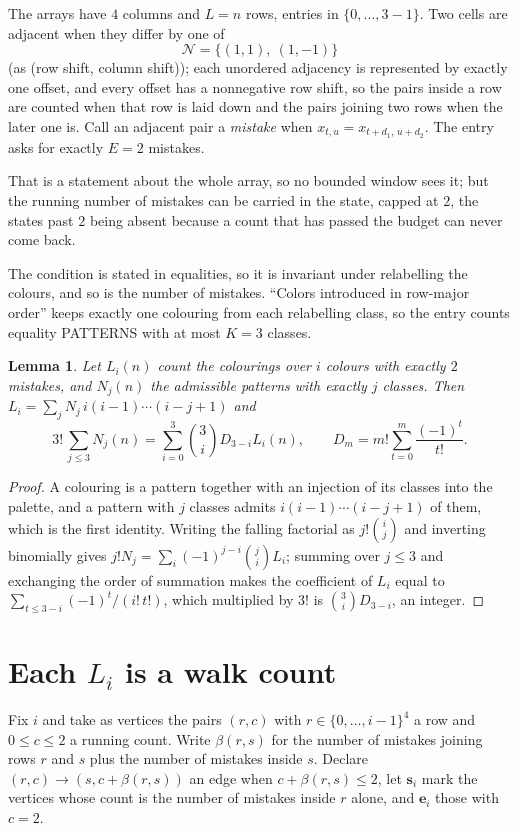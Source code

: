 \documentclass[11pt,a4paper]{article}
\theoremstyle{plain}
\newtheorem{lemma}[theorem]{Lemma}
\theoremstyle{definition}
\begin{document}
The arrays have $4$ columns and $L=n$ rows, entries in $\{0,\dots,3-1\}$.
Two cells are adjacent when they differ by one of
\[
\mathcal N=\{(1,1),\ (1,-1)\}
\]
(as (row shift, column shift)); each unordered adjacency is represented by exactly one
offset, and every offset has a nonnegative row shift, so the pairs inside a row are
counted when that row is laid down and the pairs joining two rows when the later one
is. Call an adjacent pair a \emph{mistake} when $x_{t,u}=x_{t+d_1,\,u+d_2}$. The entry asks for exactly
$E=2$ mistakes.

That is a statement about the whole array, so no bounded window sees it; but the running
number of mistakes can be carried in the state, capped at $2$, the states past $2$ being
absent because a count that has passed the budget can never come back.

The condition is stated in equalities, so it is invariant under relabelling the colours, and
so is the number of mistakes. ``Colors introduced in row-major order'' keeps exactly one
colouring from each relabelling class, so the entry counts equality PATTERNS with at most
$K=3$ classes.

\begin{lemma}\label{lem:inv}
Let $L_i(n)$ count the colourings over $i$ colours with exactly $2$ mistakes, and $N_j(n)$
the admissible patterns with exactly $j$ classes. Then
$L_i=\sum_j N_j\,i(i-1)\cdots(i-j+1)$ and
\[
3!\,\sum_{j\le3}N_j(n)=\sum_{i=0}^{3}\binom{3}{i}D_{3-i}L_i(n),
\qquad D_m=m!\sum_{t=0}^{m}\frac{(-1)^t}{t!} .
\]
\end{lemma}

\begin{proof}
A colouring is a pattern together with an injection of its classes into the palette, and a
pattern with $j$ classes admits $i(i-1)\cdots(i-j+1)$ of them, which is the first identity.
Writing the falling factorial as $j!\binom{i}{j}$ and inverting binomially gives
$j!N_j=\sum_i(-1)^{j-i}\binom{j}{i}L_i$; summing over $j\le3$ and exchanging the order
of summation makes the coefficient of $L_i$ equal to $\sum_{t\le3-i}(-1)^t/(i!\,t!)$,
which multiplied by $3!$ is $\binom{3}{i}D_{3-i}$, an integer.
\end{proof}

\section{Each $L_i$ is a walk count}

Fix $i$ and take as vertices the pairs $(r,c)$ with $r\in\{0,\dots,i-1\}^{4}$ a row
and $0\le c\le2$ a running count. Write $\beta(r,s)$ for the number of mistakes joining
rows $r$ and $s$ plus the number of mistakes inside $s$. Declare $(r,c)\to(s,c+\beta(r,s))$
an edge when $c+\beta(r,s)\le2$, let $\mathbf{s}_i$ mark the vertices whose count is the
number of mistakes inside $r$ alone, and $\mathbf{e}_i$ those with $c=2$.
\end{document}

